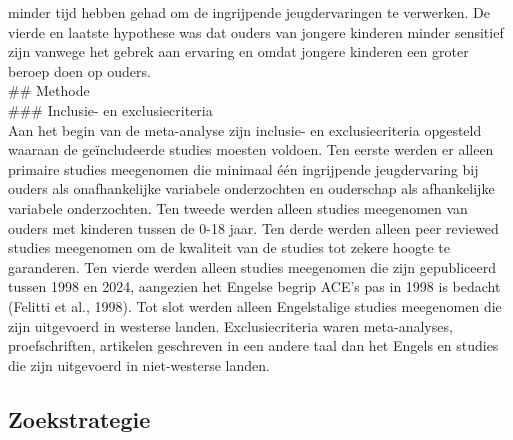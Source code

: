 \documentclass[12pt]{article}
\begin{document}
minder tijd hebben gehad om de ingrijpende jeugdervaringen te verwerken.
De vierde en laatste hypothese was dat ouders van jongere kinderen
minder sensitief zijn vanwege het gebrek aan ervaring en omdat jongere
kinderen een groter beroep doen op ouders.\\
\#\# Methode\\
\#\#\# Inclusie- en exclusiecriteria\\
Aan het begin van de meta-analyse zijn inclusie- en exclusiecriteria
opgesteld waaraan de geïncludeerde studies moesten voldoen. Ten eerste
werden er alleen primaire studies meegenomen die minimaal één
ingrijpende jeugdervaring bij ouders als onafhankelijke variabele
onderzochten en ouderschap als afhankelijke variabele onderzochten. Ten
tweede werden alleen studies meegenomen van ouders met kinderen tussen
de 0-18 jaar. Ten derde werden alleen peer reviewed studies meegenomen
om de kwaliteit van de studies tot zekere hoogte te garanderen. Ten
vierde werden alleen studies meegenomen die zijn gepubliceerd tussen
1998 en 2024, aangezien het Engelse begrip ACE's pas in 1998 is bedacht
(Felitti et al., 1998). Tot slot werden alleen Engelstalige studies
meegenomen die zijn uitgevoerd in westerse landen. Exclusiecriteria
waren meta-analyses, proefschriften, artikelen geschreven in een andere
taal dan het Engels en studies die zijn uitgevoerd in niet-westerse
landen.\\

\subsection{Zoekstrategie}\label{zoekstrategie}
\end{document}
